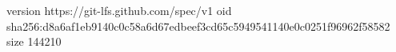 version https://git-lfs.github.com/spec/v1
oid sha256:d8a6af1eb9140c0c58a6d67edbeef3cd65c5949541140e0c0251f96962f58582
size 144210
